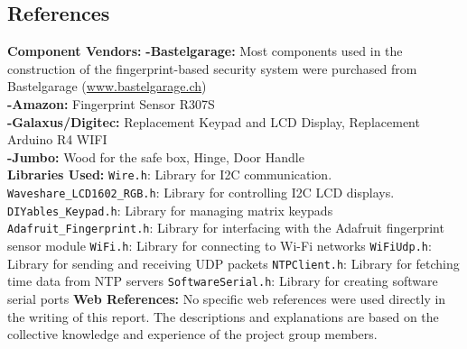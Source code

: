 \documentclass{article}
\begin{document}
\subsection{References}

\textbf{Component Vendors:}
\newline
\textbf{-Bastelgarage:} Most components used in the construction of the fingerprint-based security system were purchased from Bastelgarage (\href{https://www.bastelgarage.ch/}{www.bastelgarage.ch}) \\
\textbf{-Amazon:} Fingerprint Sensor R307S \\
\textbf{-Galaxus/Digitec:} Replacement Keypad and LCD Display, Replacement Arduino R4 WIFI\\
\textbf{-Jumbo:} Wood for the safe box, Hinge, Door Handle\\
\newline
\textbf{Libraries Used:}
\newline
\texttt{Wire.h}: Library for I2C communication.
\newline
\texttt{Waveshare\_LCD1602\_RGB.h}: Library for controlling I2C LCD displays.
\newline
\texttt{DIYables\_Keypad.h}: Library for managing matrix keypads
\newline
\texttt{Adafruit\_Fingerprint.h}: Library for interfacing with the Adafruit fingerprint sensor module
\newline
\texttt{WiFi.h}: Library for connecting to Wi-Fi networks
\newline
\texttt{WiFiUdp.h}: Library for sending and receiving UDP packets
\newline
\texttt{NTPClient.h}: Library for fetching time data from NTP servers
\newline
\texttt{SoftwareSerial.h}: Library for creating software serial ports
\newline
\newline
\textbf{Web References:}
\newline
No specific web references were used directly in the writing of this report. The descriptions and explanations are based on the collective knowledge and experience of the project group members.
\end{document}
